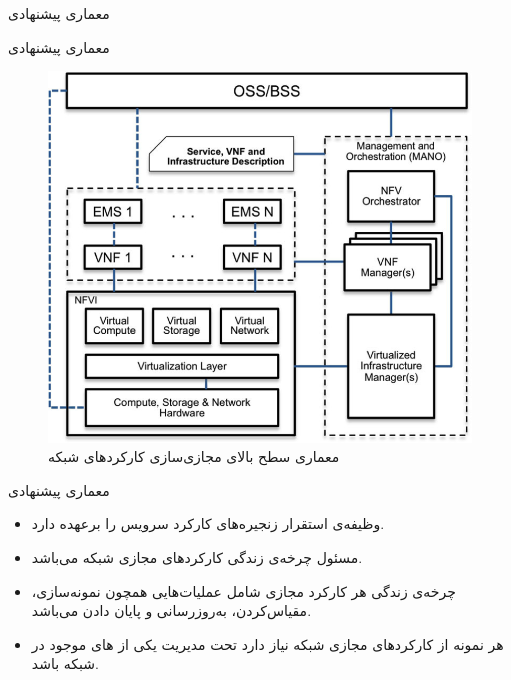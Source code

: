 \documentclass{beamer}
\makeatletter
\newcommand{\RTList}{\raggedleft\rightskip\@totalleftmargin}
\makeatother
\begin{document}
\begin{persian}
\begin{frame}{معماری پیشنهادی}
\begin{itemize}
\begin{itemize}
        \end{itemize}
    \end{itemize}
\end{frame}
\begin{frame}{معماری پیشنهادی}
    \begin{center}\begin{figure}
        \includegraphics[scale=0.5]{images/nfv-arch.png}
        \caption{معماری سطح بالای مجازی‌سازی کارکردهای شبکه}
    \end{figure}\end{center}
\end{frame}
\begin{frame}{معماری پیشنهادی}
    \begin{itemize}\RTList{}
        \justifying
        \item {} وظیفه‌ی استقرار زنجیره‌های کارکرد سرویس را برعهده دارد.
        \item {} مسئول چرخه‌ی زندگی کارکردهای مجازی شبکه می‌باشد.
        \item چرخه‌ی زندگی هر کارکرد مجازی شامل عملیات‌هایی همچون نمونه‌سازی، مقیاس‌کردن، به‌روزرسانی و پایان دادن می‌باشد.
        \item هر نمونه از کارکردهای مجازی شبکه نیاز دارد تحت مدیریت یکی از های موجود در شبکه باشد.
    \end{itemize}

\end{frame}
\end{persian}
\end{document}
